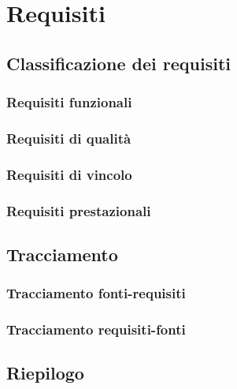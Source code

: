 \documentclass[AnalisiDeiRequisiti.tex]{subfiles}
\begin{document}
\chapter{Requisiti}
\section{Classificazione dei requisiti}
\subsection{Requisiti funzionali}

\subsection{Requisiti di qualità}

\subsection{Requisiti di vincolo}

\subsection{Requisiti prestazionali}


\section{Tracciamento}
\subsection{Tracciamento fonti-requisiti}

\subsection{Tracciamento requisiti-fonti}

\section{Riepilogo}
\end{document}
